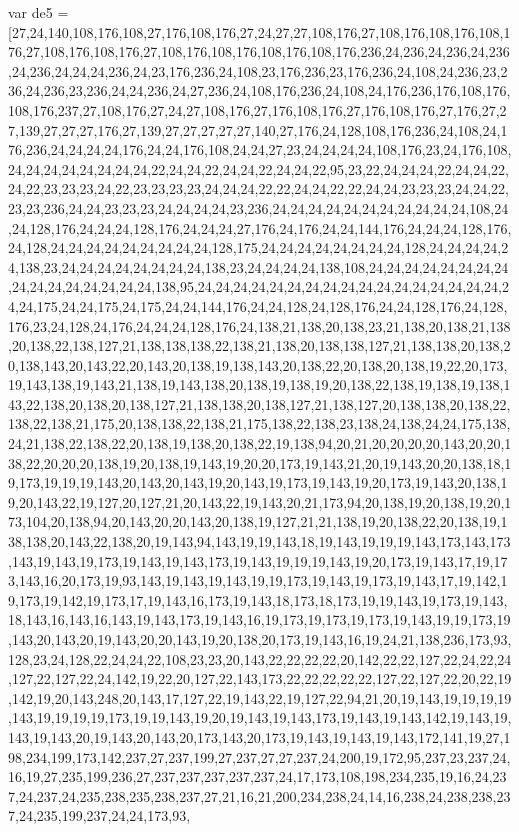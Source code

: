 var de5 = [27,24,140,108,176,108,27,176,108,176,27,24,27,27,108,176,27,108,176,108,176,108,176,27,108,176,108,176,27,108,176,108,176,108,176,108,176,236,24,236,24,236,24,236,24,236,24,24,24,236,24,23,176,236,24,108,23,176,236,23,176,236,24,108,24,236,23,236,24,236,23,236,24,24,236,24,27,236,24,108,176,236,24,108,24,176,236,176,108,176,108,176,237,27,108,176,27,24,27,108,176,27,176,108,176,27,176,108,176,27,176,27,27,139,27,27,27,176,27,139,27,27,27,27,27,140,27,176,24,128,108,176,236,24,108,24,176,236,24,24,24,24,176,24,24,176,108,24,24,27,23,24,24,24,24,108,176,23,24,176,108,24,24,24,24,24,24,24,24,22,24,24,22,24,24,22,24,24,22,95,23,22,24,24,24,22,24,24,22,24,22,23,23,23,24,22,23,23,23,23,24,24,24,22,22,24,24,22,22,24,24,23,23,23,24,24,22,23,23,236,24,24,23,23,23,24,24,24,24,23,236,24,24,24,24,24,24,24,24,24,24,24,108,24,24,128,176,24,24,24,128,176,24,24,24,27,176,24,176,24,24,144,176,24,24,24,128,176,24,128,24,24,24,24,24,24,24,24,24,128,175,24,24,24,24,24,24,24,24,128,24,24,24,24,24,138,23,24,24,24,24,24,24,24,24,138,23,24,24,24,24,138,108,24,24,24,24,24,24,24,24,24,24,24,24,24,24,24,24,138,95,24,24,24,24,24,24,24,24,24,24,24,24,24,24,24,24,24,24,24,175,24,24,175,24,175,24,24,144,176,24,24,128,24,128,176,24,24,128,176,24,128,176,23,24,128,24,176,24,24,24,128,176,24,138,21,138,20,138,23,21,138,20,138,21,138,20,138,22,138,127,21,138,138,138,22,138,21,138,20,138,138,127,21,138,138,20,138,20,138,143,20,143,22,20,143,20,138,19,138,143,20,138,22,20,138,20,138,19,22,20,173,19,143,138,19,143,21,138,19,143,138,20,138,19,138,19,20,138,22,138,19,138,19,138,143,22,138,20,138,20,138,127,21,138,138,20,138,127,21,138,127,20,138,138,20,138,22,138,22,138,21,175,20,138,138,22,138,21,175,138,22,138,23,138,24,138,24,24,175,138,24,21,138,22,138,22,20,138,19,138,20,138,22,19,138,94,20,21,20,20,20,20,143,20,20,138,22,20,20,20,138,19,20,138,19,143,19,20,20,173,19,143,21,20,19,143,20,20,138,18,19,173,19,19,19,143,20,143,20,143,19,20,143,19,173,19,143,19,20,173,19,143,20,138,19,20,143,22,19,127,20,127,21,20,143,22,19,143,20,21,173,94,20,138,19,20,138,19,20,173,104,20,138,94,20,143,20,20,143,20,138,19,127,21,21,138,19,20,138,22,20,138,19,138,138,20,143,22,138,20,19,143,94,143,19,19,143,18,19,143,19,19,19,143,173,143,173,143,19,143,19,173,19,143,19,143,173,19,143,19,19,19,143,19,20,173,19,143,17,19,173,143,16,20,173,19,93,143,19,143,19,143,19,19,173,19,143,19,173,19,143,17,19,142,19,173,19,142,19,173,17,19,143,16,173,19,143,18,173,18,173,19,19,143,19,173,19,143,18,143,16,143,16,143,19,143,173,19,143,16,19,173,19,173,19,173,19,143,19,19,173,19,143,20,143,20,19,143,20,20,143,19,20,138,20,173,19,143,16,19,24,21,138,236,173,93,128,23,24,128,22,24,24,22,108,23,23,20,143,22,22,22,22,20,142,22,22,127,22,24,22,24,127,22,127,22,24,142,19,22,20,127,22,143,173,22,22,22,22,22,127,22,127,22,20,22,19,142,19,20,143,248,20,143,17,127,22,19,143,22,19,127,22,94,21,20,19,143,19,19,19,19,143,19,19,19,19,173,19,19,143,19,20,19,143,19,143,173,19,143,19,143,142,19,143,19,143,19,143,20,19,143,20,143,20,173,143,20,173,19,143,19,143,19,143,172,141,19,27,198,234,199,173,142,237,27,237,199,27,237,27,27,237,24,200,19,172,95,237,23,237,24,16,19,27,235,199,236,27,237,237,237,237,237,24,17,173,108,198,234,235,19,16,24,237,24,237,24,235,238,235,238,237,27,21,16,21,200,234,238,24,14,16,238,24,238,238,237,24,235,199,237,24,24,173,93,